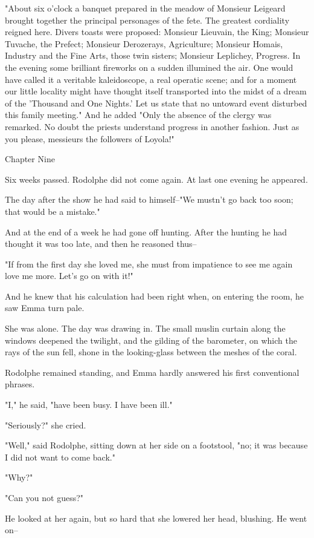 \documentclass[11pt,twocolumn]{ltugboat}
\begin{document}
"About six o'clock a banquet prepared in the meadow of Monsieur Leigeard
brought together the principal personages of the fete. The greatest
cordiality reigned here. Divers toasts were proposed: Monsieur
Lieuvain, the King; Monsieur Tuvache, the Prefect; Monsieur Derozerays,
Agriculture; Monsieur Homais, Industry and the Fine Arts, those twin
sisters; Monsieur Leplichey, Progress. In the evening some brilliant
fireworks on a sudden illumined the air. One would have called it a
veritable kaleidoscope, a real operatic scene; and for a moment our
little locality might have thought itself transported into the midst of
a dream of the 'Thousand and One Nights.' Let us state that no untoward
event disturbed this family meeting." And he added "Only the absence
of the clergy was remarked. No doubt the priests understand progress in
another fashion. Just as you please, messieurs the followers of Loyola!"



Chapter Nine

Six weeks passed. Rodolphe did not come again. At last one evening he
appeared.

The day after the show he had said to himself--"We mustn't go back too
soon; that would be a mistake."

And at the end of a week he had gone off hunting. After the hunting he
had thought it was too late, and then he reasoned thus--

"If from the first day she loved me, she must from impatience to see me
again love me more. Let's go on with it!"

And he knew that his calculation had been right when, on entering the
room, he saw Emma turn pale.

She was alone. The day was drawing in. The small muslin curtain along
the windows deepened the twilight, and the gilding of the barometer, on
which the rays of the sun fell, shone in the looking-glass between the
meshes of the coral.

Rodolphe remained standing, and Emma hardly answered his first
conventional phrases.

"I," he said, "have been busy. I have been ill."

"Seriously?" she cried.

"Well," said Rodolphe, sitting down at her side on a footstool, "no; it
was because I did not want to come back."

"Why?"

"Can you not guess?"

He looked at her again, but so hard that she lowered her head, blushing.
He went on--
\end{document}
